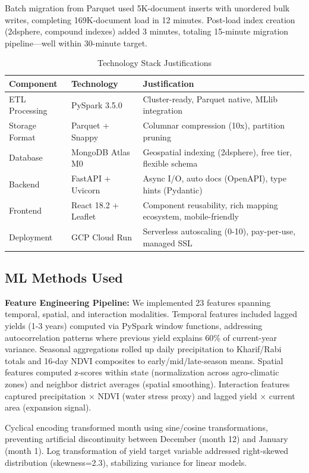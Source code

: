 \documentclass[10pt,a4paper]{article}
\begin{document}
Batch migration from Parquet used 5K-document inserts with unordered bulk writes, completing 169K-document load in 12 minutes. Post-load index creation (2dsphere, compound indexes) added 3 minutes, totaling 15-minute migration pipeline—well within 30-minute target.

\begin{table}[h]
\centering
\caption{Technology Stack Justifications}
\small
\begin{tabular}{@{}p{3cm}p{3cm}p{6cm}@{}}
\toprule
\textbf{Component} & \textbf{Technology} & \textbf{Justification} \\
\midrule
ETL Processing & PySpark 3.5.0 & Cluster-ready, Parquet native, MLlib integration \\
Storage Format & Parquet + Snappy & Columnar compression (10x), partition pruning \\
Database & MongoDB Atlas M0 & Geospatial indexing (2dsphere), free tier, flexible schema \\
Backend & FastAPI + Uvicorn & Async I/O, auto docs (OpenAPI), type hints (Pydantic) \\
Frontend & React 18.2 + Leaflet & Component reusability, rich mapping ecosystem, mobile-friendly \\
Deployment & GCP Cloud Run & Serverless autoscaling (0-10), pay-per-use, managed SSL \\
\bottomrule
\end{tabular}
\label{tab:tech}
\end{table}

\subsection{ML Methods Used}

\textbf{Feature Engineering Pipeline:}
We implemented 23 features spanning temporal, spatial, and interaction modalities. Temporal features included lagged yields (1-3 years) computed via PySpark window functions, addressing autocorrelation patterns where previous yield explains 60\% of current-year variance. Seasonal aggregations rolled up daily precipitation to Kharif/Rabi totals and 16-day NDVI composites to early/mid/late-season means. Spatial features computed z-scores within state (normalization across agro-climatic zones) and neighbor district averages (spatial smoothing). Interaction features captured precipitation × NDVI (water stress proxy) and lagged yield × current area (expansion signal).

Cyclical encoding transformed month using sine/cosine transformations, preventing artificial discontinuity between December (month 12) and January (month 1). Log transformation of yield target variable addressed right-skewed distribution (skewness=2.3), stabilizing variance for linear models.
\end{document}
